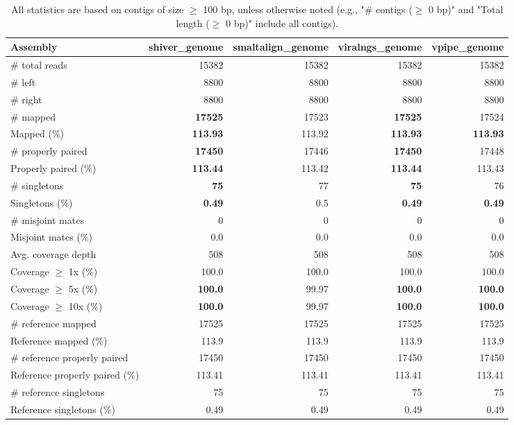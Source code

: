 \documentclass[12pt,a4paper]{article}
\begin{document}
\begin{table}[ht]
\begin{center}
\caption{All statistics are based on contigs of size $\geq$ 100 bp, unless otherwise noted (e.g., "\# contigs ($\geq$ 0 bp)" and "Total length ($\geq$ 0 bp)" include all contigs).}
\begin{tabular}{|l*{4}{|r}|}
\hline
Assembly & shiver\_genome & smaltalign\_genome & viralngs\_genome & vpipe\_genome \\ \hline
\# total reads & 15382 & 15382 & 15382 & 15382 \\ \hline
\# left & 8800 & 8800 & 8800 & 8800 \\ \hline
\# right & 8800 & 8800 & 8800 & 8800 \\ \hline
\# mapped & {\bf 17525} & 17523 & {\bf 17525} & 17524 \\ \hline
Mapped (\%) & {\bf 113.93} & 113.92 & {\bf 113.93} & {\bf 113.93} \\ \hline
\# properly paired & {\bf 17450} & 17446 & {\bf 17450} & 17448 \\ \hline
Properly paired (\%) & {\bf 113.44} & 113.42 & {\bf 113.44} & 113.43 \\ \hline
\# singletons & {\bf 75} & 77 & {\bf 75} & 76 \\ \hline
Singletons (\%) & {\bf 0.49} & 0.5 & {\bf 0.49} & {\bf 0.49} \\ \hline
\# misjoint mates & 0 & 0 & 0 & 0 \\ \hline
Misjoint mates (\%) & 0.0 & 0.0 & 0.0 & 0.0 \\ \hline
Avg. coverage depth & 508 & 508 & 508 & 508 \\ \hline
Coverage $\geq$ 1x (\%) & 100.0 & 100.0 & 100.0 & 100.0 \\ \hline
Coverage $\geq$ 5x (\%) & {\bf 100.0} & 99.97 & {\bf 100.0} & {\bf 100.0} \\ \hline
Coverage $\geq$ 10x (\%) & {\bf 100.0} & 99.97 & {\bf 100.0} & {\bf 100.0} \\ \hline
\# reference mapped & 17525 & 17525 & 17525 & 17525 \\ \hline
Reference mapped (\%) & 113.9 & 113.9 & 113.9 & 113.9 \\ \hline
\# reference properly paired & 17450 & 17450 & 17450 & 17450 \\ \hline
Reference properly paired (\%) & 113.41 & 113.41 & 113.41 & 113.41 \\ \hline
\# reference singletons & 75 & 75 & 75 & 75 \\ \hline
Reference singletons (\%) & 0.49 & 0.49 & 0.49 & 0.49 \\ \hline

\end{tabular}
\end{center}
\end{table}
\end{document}
